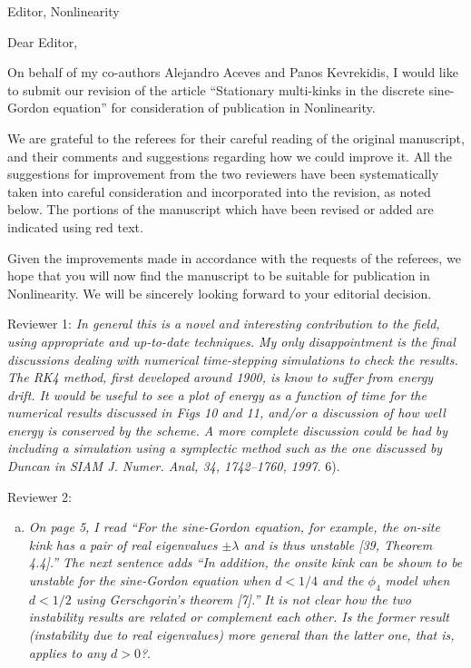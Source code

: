 \documentclass[11pt]{letter}
\begin{document}
\address{Ross Parker \\
Department of Mathematics \\
Southern Methodist University \\
Dallas, TX 75275 \\
\texttt{rhparker@smu.edu}}%
\signature{Ross Parker}
\begin{letter}{Editor, Nonlinearity}

\opening{Dear Editor,}

On behalf of my co-authors Alejandro Aceves and Panos Kevrekidis, I would like to submit our revision of the article ``Stationary multi-kinks in the discrete sine-Gordon equation'' for consideration of publication in Nonlinearity. 

We are grateful to the referees for their careful reading of the original manuscript, and their comments and suggestions regarding how we could improve it. All the suggestions for improvement from the two reviewers have been systematically taken into careful consideration and incorporated into the revision, as noted below. The portions of the manuscript which have been revised or added are indicated using red text. 

Given the improvements made in accordance with the requests of the referees, we hope that you will now find the manuscript to be suitable for publication in Nonlinearity. We will be sincerely looking forward to your editorial decision.

Reviewer 1: \emph{In general this is a novel and interesting contribution to the field, using appropriate and up-to-date techniques. My only disappointment is the final discussions dealing with numerical time-stepping simulations to check the results.  The RK4 method, first developed around 1900, is know to suffer from energy drift.  It would be useful to see a plot of energy as a function of time for the numerical results discussed in Figs 10 and 11, and/or a discussion of how well energy is conserved by the scheme.  A more complete discussion could be had by including a simulation using a symplectic method such as the one discussed by Duncan in SIAM J. Numer. Anal, 34, 1742–1760, 1997.} 6).

Reviewer 2:
\begin{enumerate}[(a)]
\item \emph{On page 5, I read ``For the sine-Gordon equation, for example, the on-site kink has a pair of real eigenvalues $\pm \lambda$ and is thus unstable [39, Theorem 4.4].'' The next sentence adds ``In addition, the onsite kink can be shown to be unstable for the sine-Gordon equation when $d < 1/4$ and the $\phi_4$ model when $d < 1/2$ using Gerschgorin’s theorem [7].'' It is not clear how the two instability results are related or complement each other. Is the former result (instability due to real eigenvalues) more general than the latter one, that is, applies to any $d > 0$?}.


\end{enumerate}
\end{letter}
\end{document}
